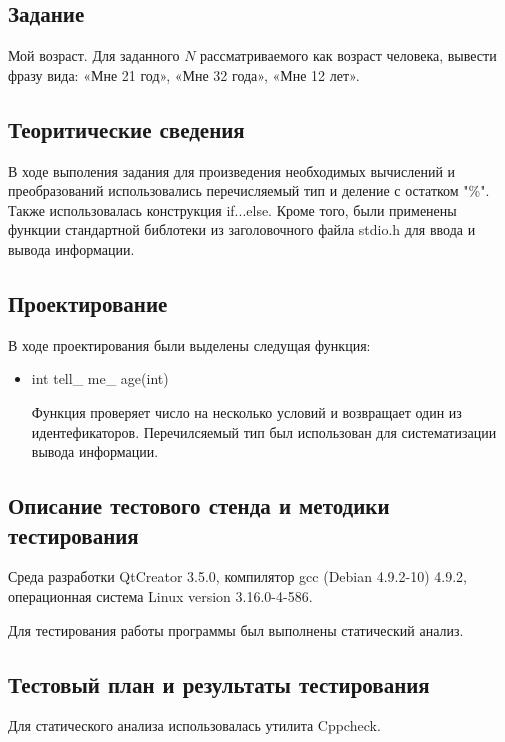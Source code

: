 \documentclass[12pt,a4paper]{report}
\begin{document}
\subsection{Задание}

Мой возраст. Для заданного $N$ рассматриваемого как возраст человека, вывести фразу вида: «Мне 21 год», «Мне 32 года», «Мне 12 лет». 

\subsection{Теоритические сведения}

В ходе выполения задания для произведения необходимых вычислений и преобразований использовались перечисляемый тип и деление с остатком "\%". Также использовалась конструкция if...else. Кроме того, были применены функции стандартной библотеки из заголовочного файла stdio.h для ввода и вывода информации.

\subsection{Проектирование}


В ходе проектирования были выделены следущая функция:

\begin{itemize}

	\item int tell\_ me\_ age(int)

	Функция проверяет число на несколько условий и возвращает один из идентефикаторов. Перечилсяемый тип был использован для систематизации вывода информации.
	
\end{itemize}


\subsection{Описание тестового стенда и методики тестирования}
Среда разработки QtCreator 3.5.0, компилятор gcc (Debian 4.9.2-10) 4.9.2, операционная система Linux version 3.16.0-4-586.

Для тестирования работы программы был выполнены статический анализ.

\subsection{Тестовый план и результаты тестирования}

		Для статического анализа использовалась утилита Cppcheck.
		
\end{document}
